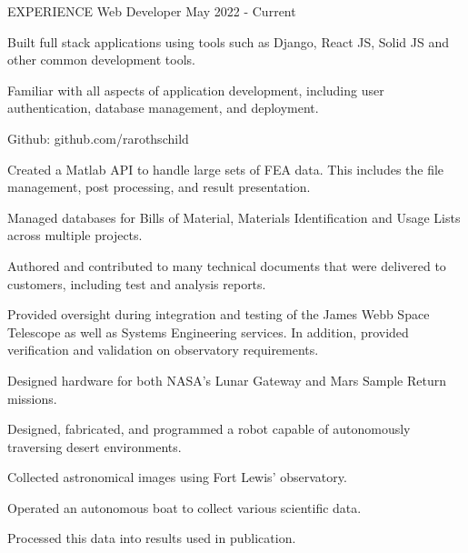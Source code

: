 \documentclass{resume} %
\begin{document}
\begin{newSection}{EXPERIENCE}
     {Web Developer} {May 2022 - Current}
    \begin{myList}
        \item Built full stack applications using tools such as Django, React JS, Solid JS and other common development tools.
        \item Familiar with all aspects of application development, including user authentication, database management, and deployment.
        \item Github: github.com/rarothschild
    \end{myList}
    
    \begin{myList}
        \item Created a Matlab API to handle large sets of FEA data. This includes the file management, post processing, and result presentation.
        \item Managed databases for Bills of Material, Materials Identification and Usage Lists across multiple projects.
        \item Authored and contributed to many technical documents that were delivered to customers, including test and analysis reports.
        \item Provided oversight during integration and testing of the James Webb Space Telescope as well as Systems Engineering services. In addition, provided verification and validation on observatory requirements.
        \item Designed hardware for both NASA's Lunar Gateway and Mars Sample Return missions.
    \end{myList}
    
    \begin{myList}
        \item Designed, fabricated, and programmed a robot capable of autonomously traversing desert environments.
        \item Collected astronomical images using Fort Lewis' observatory.
    \end{myList}
    
    \begin{myList}
        \item Operated an autonomous boat to collect various scientific data.
        \item Processed this data into results used in publication.
    \end{myList}
\end{newSection} 
\end{document}
